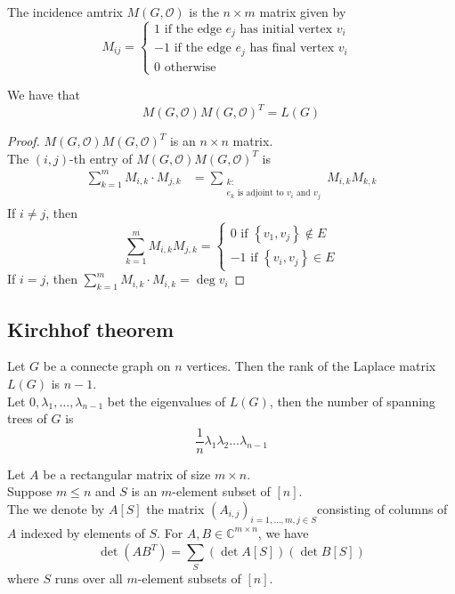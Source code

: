 \documentclass[../main.tex]{subfiles}
\begin{document}
\begin{defn}
	The incidence amtrix $M( G, \mathcal{O}) $ is the $n\times m$ matrix given by
	\[ 
	M_{ij} =
	\begin{cases}
	1 \text{ if the edge $e_j$ has initial vertex $v_i$ } \\
	-1 \text{ if the edge $e_j$ has final vertex $v_i$ } \\
	0 \text{ otherwise } 	
	\end{cases}
	\]
	
\end{defn}
\begin{lemma}
We have that 
\[ 
	M( G, \mathcal{O}) M( G, \mathcal{O}) ^{T}= L( G) 
\]

\end{lemma}
\begin{proof}
	$M( G, \mathcal{O}) M( G, \mathcal{O}) ^{T}$ is an $n\times n$ matrix.\\
	The $( i,j) $-th entry of $M( G, \mathcal{O}) M( G, \mathcal{O}) ^{T}$ is
	\begin{align*}
		\sum_{k=1}^{ m} M_{i,k} \cdot M_{j,k} &= \sum_{ \substack{k: \\ e_k \text{ is adjoint to }v_i \text{ and  } v_j }} M_{i,k } M_{k,k} 
	\end{align*}
	If $i\neq j$, then 
	\[
	\sum_{k=1}^{ m}M_{i,k} M_{j,k} = 
	\begin{cases}
	0 \text{ if }  \left\{ v_1,v_j \right\} \notin E\\
	-1 \text{ if  } \left\{ v_i, v_j \right\} \in E
	\end{cases}
\]
	If $i=j$, then $ \sum_{k=1}^{ m}M_{i,k} \cdot M_{i,k} = \deg v_i$
\end{proof}
\subsection{Kirchhof theorem}

\begin{thm}[Kirchhoff]
	Let $G$ be a connecte graph on $n$ vertices. Then the rank of the Laplace matrix $L( G) $ is $n-1$.\\
	Let $0, \lambda_1, \ldots, \lambda_{n-1} $ bet the eigenvalues of $L( G) $, then the number of spanning trees of $G$ is
	\[ 
	\frac{1}{n} \lambda_1 \lambda_2 \ldots \lambda_{n-1} 
	\]
	
\end{thm}
\begin{thm}
	Let $A$ be a rectangular matrix of size $m\times n$.\\
	Suppose $m \leq n$ and $S$ is an $m$-element subset of $[n]$.\\
	The we denote by $A[S]$ the matrix $( A_{i,j} ) _{i=1,\ldots, m, j \in S}$consisting of columns of $A$ indexed by elements of $S$.
	For $A,B \in \mathbb{C}^{m\times n}$, we have
	\[ 
		\det ( AB^{T}) = \sum_{S}^{ }( \det A[S]) ( \det B[S]) 
	\]
	where $S$ runs over all $m$-element subsets of $ [ n]  $.
\end{thm}
\end{document}
